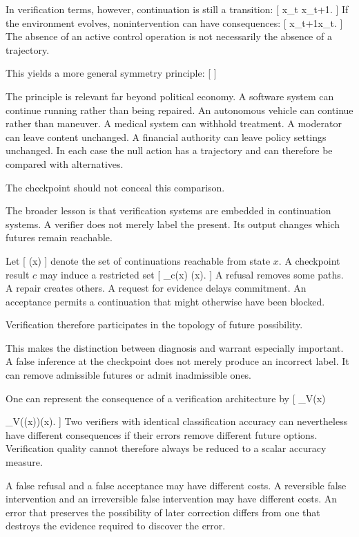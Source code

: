 \documentclass[11pt]{article}
\begin{document}
In verification terms, however, continuation is still a transition:
[
x_t
\xrightarrow{\varnothing}
x_{t+1}.
]
If the environment evolves, nonintervention can have consequences:
[
x_{t+1}\neq x_t.
]
The absence of an active control operation is not necessarily the absence of a trajectory.

This yields a more general symmetry principle:
[
]

The principle is relevant far beyond political economy. A software system can continue running rather than being repaired. An autonomous vehicle can continue rather than maneuver. A medical system can withhold treatment. A moderator can leave content unchanged. A financial authority can leave policy settings unchanged. In each case the null action has a trajectory and can therefore be compared with alternatives.

The checkpoint should not conceal this comparison.

The broader lesson is that verification systems are embedded in continuation systems. A verifier does not merely label the present. Its output changes which futures remain reachable.

Let
[
(x)
]
denote the set of continuations reachable from state $x$. A checkpoint result $c$ may induce a restricted set
[
_c(x)
\subseteq
{}(x).
]
A refusal removes some paths. A repair creates others. A request for evidence delays commitment. An acceptance permits a continuation that might otherwise have been blocked.

Verification therefore participates in the topology of future possibility.

This makes the distinction between diagnosis and warrant especially important. A false inference at the checkpoint does not merely produce an incorrect label. It can remove admissible futures or admit inadmissible ones.

One can represent the consequence of a verification architecture by
[
\Gamma_V(x)

_{V(\pi(x))}(x).
]
Two verifiers with identical classification accuracy can nevertheless have different consequences if their errors remove different future options. Verification quality cannot therefore always be reduced to a scalar accuracy measure.

A false refusal and a false acceptance may have different costs. A reversible false intervention and an irreversible false intervention may have different costs. An error that preserves the possibility of later correction differs from one that destroys the evidence required to discover the error.
\end{document}
